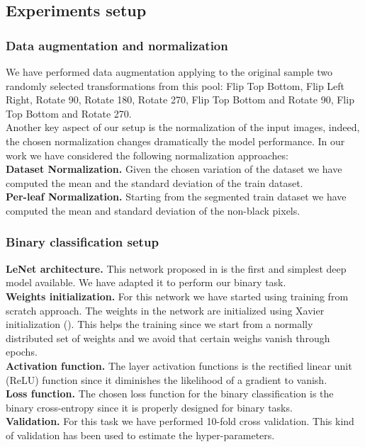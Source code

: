 \subsection{Experiments setup}
\subsubsection{Data augmentation and normalization}
We have performed data augmentation applying to the original sample two randomly selected transformations from this pool: Flip Top Bottom, Flip Left Right, Rotate 90\degree, Rotate 180\degree, Rotate 270\degree, Flip Top Bottom and Rotate 90\degree, Flip Top Bottom and Rotate 270\degree.
\\
Another key aspect of our setup is the normalization of the input images, indeed, the chosen normalization changes dramatically the model performance. In our work we have considered the following normalization approaches:
\\
\textbf{Dataset Normalization.} Given the chosen variation of the dataset we have computed the mean and the standard deviation of the train dataset.
\\
\textbf{Per-leaf Normalization.} Starting from the segmented train dataset we have computed the mean and standard deviation of the non-black pixels.
\subsubsection{Binary classification setup}
\textbf{LeNet architecture.} This network proposed in \cite{ref30} is the first and simplest deep model available. We have adapted it to perform our binary task.
\\
\textbf{Weights initialization.} For this network we have started using training from scratch approach. The weights in the network are initialized using Xavier initialization (\cite{ref31}). This helps the training since we start from a normally distributed set of weights and we avoid that certain weighs vanish through epochs.
\\
\textbf{Activation function.}
The layer activation functions is the rectified linear unit (ReLU) function since it diminishes the likelihood of a gradient to vanish.
\\
\textbf{Loss function.}
The chosen loss function for the binary classification is the binary cross-entropy since it is properly designed for binary tasks.
\\
\textbf{Validation.}
For this task we have performed 10-fold cross validation. This kind of validation has been used to estimate the hyper-parameters.
